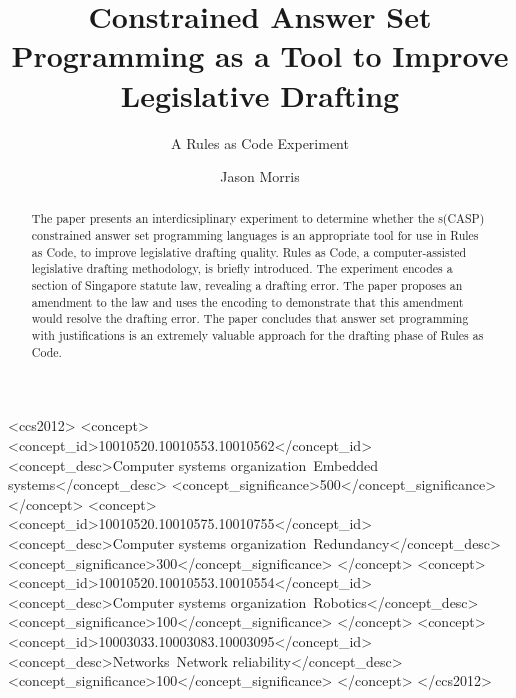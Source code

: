 \documentclass[sigconf]{acmart}
\begin{document}
\title{Constrained Answer Set Programming as a Tool to Improve Legislative Drafting}
\subtitle{A Rules as Code Experiment}

\author{Jason Morris}


\begin{abstract}
  The paper presents an interdicsiplinary experiment to determine whether
  the s(CASP) constrained answer set programming languages is an appropriate
  tool for use in Rules as Code, to improve legislative drafting quality.
  Rules as Code, a computer-assisted legislative
  drafting methodology, is briefly introduced. The experiment encodes a section
  of Singapore statute law, revealing a drafting
  error. The paper proposes an amendment to the law and uses the encoding to demonstrate that this amendment would resolve the drafting error.
  The paper concludes that answer set programming with
  justifications is an extremely valuable approach for the drafting phase of
  Rules as Code.
\end{abstract}

\begin{CCSXML}
<ccs2012>
 <concept>
  <concept_id>10010520.10010553.10010562</concept_id>
  <concept_desc>Computer systems organization~Embedded systems</concept_desc>
  <concept_significance>500</concept_significance>
 </concept>
 <concept>
  <concept_id>10010520.10010575.10010755</concept_id>
  <concept_desc>Computer systems organization~Redundancy</concept_desc>
  <concept_significance>300</concept_significance>
 </concept>
 <concept>
  <concept_id>10010520.10010553.10010554</concept_id>
  <concept_desc>Computer systems organization~Robotics</concept_desc>
  <concept_significance>100</concept_significance>
 </concept>
 <concept>
  <concept_id>10003033.10003083.10003095</concept_id>
  <concept_desc>Networks~Network reliability</concept_desc>
  <concept_significance>100</concept_significance>
 </concept>
</ccs2012>
\end{CCSXML}
\end{document}
